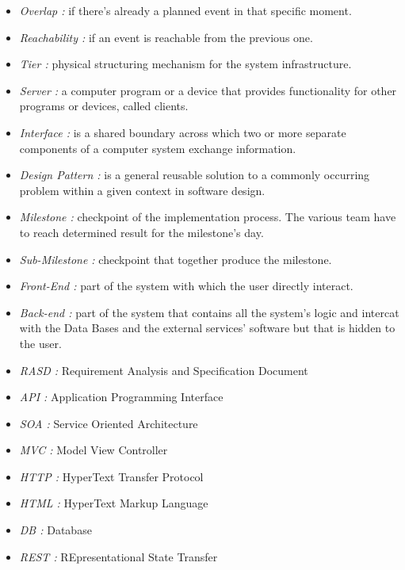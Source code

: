 \begin{itemize}
	\item \emph{Overlap :} if there’s already a planned event in that specific moment.
	\item \emph{Reachability :} if an event is reachable from the previous one.
	\item \emph{Tier :} physical structuring mechanism for the system infrastructure.
	\item \emph{Server :} a computer program or a device that provides functionality for other programs or devices, called clients.
	\item \emph{Interface :} is a shared boundary across which two or more separate components of a computer system exchange information.
	\item \emph{Design Pattern :} is a general reusable solution to a commonly occurring problem within a given context in software design.
	\item \emph{Milestone :} checkpoint of the implementation process. The various team have to reach determined result for the milestone's day.
	\item \emph{Sub-Milestone :} checkpoint that together produce the milestone.
	\item \emph{Front-End :} part of the system with which the user directly interact.
	\item \emph{Back-end :} part of the system that contains all the system's logic and intercat with the Data Bases and the external services' software but that is hidden to the user.
\end{itemize}

\begin{itemize}
	\setlength{\leftskip}{0.5cm}
	\item \emph{RASD :} Requirement Analysis and Specification Document
	\item \emph{API :} Application Programming Interface
	\item \emph{SOA :} Service Oriented Architecture
	\item \emph{MVC :} Model View Controller
	\item \emph{HTTP :} HyperText Transfer Protocol
	\item \emph{HTML :} HyperText Markup Language
	\item \emph{DB :} Database
	\item \emph{REST :} REpresentational State Transfer
\end{itemize}

